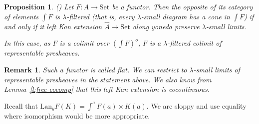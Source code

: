 \documentclass{article}
\newcommand{\Lan}{\text{Lan}}
\newcommand{\Set}{\text{Set}}
\newtheorem{proposition}[theorem]{Proposition}
\newtheorem{remark}[theorem]{Remark}
\newtheorem{lemma}[theorem]{Lemma}
\begin{document}
\begin{proposition}
  (\cite[2.24]{adamek_rosicky})
  \label{prop:flat-functor}
 Let $F:A \rightarrow \Set$ be a functor. Then the opposite of its category of elements $\int F$
 is $\lambda$-filtered (that is, every $\lambda$-small diagram has a cone in
 $\int F$) if and only if it left Kan
 extension $\hat{A}\rightarrow \Set$ along yoneda preserve $\lambda$-small limits.

 In this case, as $F$ is a colimit over $(\int F)^o$, 
 $F$ is a $\lambda$-filtered colimit of representable presheaves.
\end{proposition}
\begin{remark}
  Such a functor is called \emph{flat}.
  We can restrict to $\lambda$-small limits of representable presheaves in the
  statement above.
  We also know from Lemma~\ref{l:free-cocomp} that this left Kan extension is
  cocontinuous.
\end{remark}
  
  Recall that $\Lan_yF(K) = \int^a F(a)\times K(a)$.
 We are sloppy and use equality where isomorphism would be more appropriate.
\end{document}
